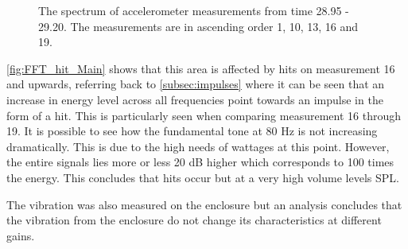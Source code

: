 \begin{figure}[H]
\centering
{}

\caption{The spectrum of accelerometer measurements from time 28.95 - 29.20. The measurements are in ascending order 1, 10, 13, 16 and 19.}
\label{fig:FFT_hit_Main}
\end{figure}

\autoref{fig:FFT_hit_Main} shows that this area is affected by hits on measurement 16 and upwards, referring back to \autoref{subsec:impulses} where it can be seen that an increase in energy level across all frequencies point towards an impulse in the form of a hit. This is particularly seen when comparing measurement 16 through 19. It is possible to see how the fundamental tone at 80 Hz is not increasing dramatically. This is due to the high needs of wattages at this point. However, the entire signals lies more or less 20 dB higher which corresponds to 100 times the energy. This concludes that hits occur but at a very high volume levels \gls{SPL}.

The vibration was also measured on the enclosure but an analysis concludes that the vibration from the enclosure do not change its characteristics at different gains.





